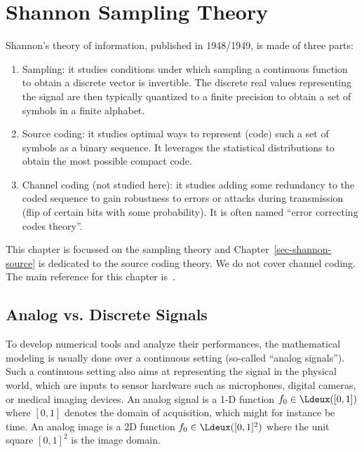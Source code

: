 
\chapter{Shannon Sampling Theory}
\label{sec-shannon}

%
Shannon's theory of information, published in 1948/1949, is made of three parts:
\begin{enumerate}
	\item Sampling: it studies conditions under which sampling a continuous function to obtain a discrete vector is invertible. The discrete real values representing the signal are then typically quantized to a finite precision to obtain a set of symbols in a finite alphabet.  
	\item Source coding: it studies optimal ways to represent (code) such a set of symbols as a binary sequence. It leverages the statistical distributions to obtain the most possible compact code.  
	\item Channel coding (not studied here): it studies adding some redundancy to the coded sequence to gain robustness to errors or attacks during transmission (flip of certain bits with some probability). It is often named ``error correcting codes theory''. 
\end{enumerate}
%
This chapter is focussed on the sampling theory and Chapter~\ref{sec-shannon-source} is dedicated to the source coding theory. We do not cover channel coding. 
%
The main reference for this chapter is~\cite{mallat2008wavelet}.


\section{Analog vs. Discrete Signals}

To develop numerical tools and analyze their performances, the mathematical modeling is usually done over a continuous setting (so-called ``analog signals''). 
%
Such a continuous setting also aims at representing the signal in the physical world, which are inputs to sensor hardware such as microphones, digital cameras, or medical imaging devices. 
%
An analog signal is a 1-D function $f_0 \in \Ldeux([0,1])$ where $[0,1]$ denotes the domain of acquisition, which might for instance be time. An analog image is a 2D function $f_0 \in \Ldeux([0,1]^2)$ where the unit square $[0,1]^2$ is the image domain.

